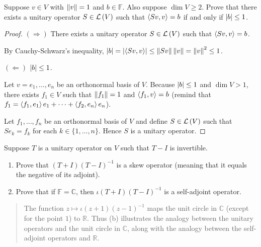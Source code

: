 \begin{exercise}
    Suppose $v \in V$ with $\left\Vert{v}\right\Vert = 1$ and $b \in \mathbb{F}$. Also suppose $\dim V \geq 2$. Prove that there exists a unitary operator $S \in \mathcal{L}\left({V}\right)$ such that $\left\langle{Sv, v}\right\rangle = b$ if and only if $\left\vert{b}\right\vert\leq 1$.
\end{exercise}

\begin{proof}
    $(\Rightarrow)$ There exists a unitary operator $S \in \mathcal{L}\left({V}\right)$ such that $\left\langle{Sv, v}\right\rangle = b$.

    By Cauchy-Schwarz's inequality, $\left\vert{b}\right\vert = \left\vert{\left\langle{Sv, v}\right\rangle}\right\vert\leq \left\Vert{Sv}\right\Vert\left\Vert{v}\right\Vert = \left\Vert{v}\right\Vert^{2}\leq 1$.

    $(\Leftarrow)$ $\left\vert{b}\right\vert\leq 1$.

    Let $v = e_{1}, \ldots, e_{n}$ be an orthonormal basis of $V$. Because $\left\vert{b}\right\vert\leq 1$ and $\dim V > 1$, there exists $f_{1}\in V$ such that $\left\Vert{f_{1}}\right\Vert = 1$ and $\left\langle{f_{1}, v}\right\rangle = b$ (remind that $f_{1} = \left\langle{f_{1}, e_{1}}\right\rangle e_{1} + \cdots + \left\langle{f_{2}, e_{n}}\right\rangle e_{n}$).

    Let $f_{1}, \ldots, f_{n}$ be an orthonormal basis of $V$ and define $S\in\mathcal{L}\left({V}\right)$ such that $Se_{k} = f_{k}$ for each $k\in\{ 1,\ldots,n \}$. Hence $S$ is a unitary operator.
\end{proof}
\newpage

\begin{exercise}
    Suppose $T$ is a unitary operator on $V$ such that $T - I$ is invertible.
    \begin{enumerate}[label={(\alph*)}]
        \item Prove that $(T + I){(T - I)}^{-1}$ is a skew operator (meaning that it equals the negative of its adjoint).
        \item Prove that if $\mathbb{F} = \mathbb{C}$, then $\iota (T + I){(T - I)}^{-1}$ is a self-adjoint operator.
    \end{enumerate}
\end{exercise}

\begin{quote}
    The function $z \mapsto \iota (z + 1){(z - 1)}^{-1}$ maps the unit circle in $\mathbb{C}$ (except for the point $1$) to $\mathbb{R}$. Thus (b) illustrates the analogy between the unitary operators and the unit circle in $\mathbb{C}$, along with the analogy between the self-adjoint operators and $\mathbb{R}$.
\end{quote}

